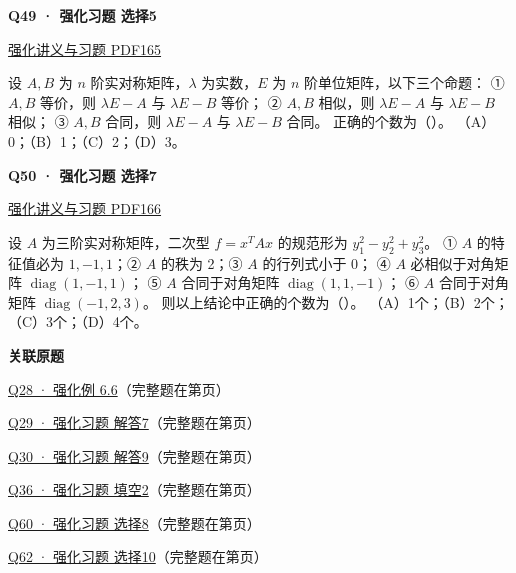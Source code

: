 \documentclass[UTF8,fontset=fandol,11pt,a4paper]{ctexart}
\newcommand{\source}[1]{{\footnotesize\color{Muted}#1\par}}
\newcommand{\qtitle}[2]{\par\needspace{5\baselineskip}\hypertarget{#1}{}\label{#1}\textbf{#2}\par}
\begin{document}
\begin{minipage}{\linewidth}
\qtitle{R-MC-05}{Q49 · 强化习题 选择5}
\source{\href{file:///Users/skyintelligence/Desktop/\%E5\%BE\%97\%E8\%AF\%BB\%E4\%B8\%AA\%E7\%A0\%94-\%E5\%8C\%97\%E5\%A4\%A7\%E8\%BD\%AF\%E5\%BE\%AE/\%E6\%95\%B0\%E5\%AD\%A6\%20150/Kira\%C2\%B727\%E7\%BA\%BF\%E6\%80\%A7\%E4\%BB\%A3\%E6\%95\%B0\%E5\%BC\%BA\%E5\%8C\%96\%E8\%AE\%B2\%E4\%B9\%89\%2B\%E4\%B9\%A0\%E9\%A2\%98.pdf\#page=165}{强化讲义与习题 PDF165}}
设 $A,B$ 为 $n$ 阶实对称矩阵，$\lambda$ 为实数，$E$ 为 $n$ 阶单位矩阵，以下三个命题：
① $A,B$ 等价，则 $\lambda E-A$ 与 $\lambda E-B$ 等价；
② $A,B$ 相似，则 $\lambda E-A$ 与 $\lambda E-B$ 相似；
③ $A,B$ 合同，则 $\lambda E-A$ 与 $\lambda E-B$ 合同。
正确的个数为（\quad）。
（A）0；（B）1；（C）2；（D）3。
\end{minipage}\par\vspace{7mm}
\begin{minipage}{\linewidth}
\qtitle{R-MC-07}{Q50 · 强化习题 选择7}
\source{\href{file:///Users/skyintelligence/Desktop/\%E5\%BE\%97\%E8\%AF\%BB\%E4\%B8\%AA\%E7\%A0\%94-\%E5\%8C\%97\%E5\%A4\%A7\%E8\%BD\%AF\%E5\%BE\%AE/\%E6\%95\%B0\%E5\%AD\%A6\%20150/Kira\%C2\%B727\%E7\%BA\%BF\%E6\%80\%A7\%E4\%BB\%A3\%E6\%95\%B0\%E5\%BC\%BA\%E5\%8C\%96\%E8\%AE\%B2\%E4\%B9\%89\%2B\%E4\%B9\%A0\%E9\%A2\%98.pdf\#page=166}{强化讲义与习题 PDF166}}
设 $A$ 为三阶实对称矩阵，二次型 $f=x^TAx$ 的规范形为 $y_1^2-y_2^2+y_3^2$。
① $A$ 的特征值必为 $1,-1,1$；② $A$ 的秩为 2；③ $A$ 的行列式小于 0；
④ $A$ 必相似于对角矩阵 $\operatorname{diag}(1,-1,1)$；
⑤ $A$ 合同于对角矩阵 $\operatorname{diag}(1,1,-1)$；
⑥ $A$ 合同于对角矩阵 $\operatorname{diag}(-1,2,3)$。
则以上结论中正确的个数为（\quad）。
（A）1个；（B）2个；（C）3个；（D）4个。
\end{minipage}\par\vspace{7mm}
\textbf{关联原题}\par
\hyperlink{R-EX-06}{Q28 · 强化例 6.6}（完整题在第\pageref*{R-EX-06}页）\par
\hyperlink{R-LONG-07}{Q29 · 强化习题 解答7}（完整题在第\pageref*{R-LONG-07}页）\par
\hyperlink{R-LONG-09}{Q30 · 强化习题 解答9}（完整题在第\pageref*{R-LONG-09}页）\par
\hyperlink{R-FILL-02}{Q36 · 强化习题 填空2}（完整题在第\pageref*{R-FILL-02}页）\par
\hyperlink{R-MC-08}{Q60 · 强化习题 选择8}（完整题在第\pageref*{R-MC-08}页）\par
\hyperlink{R-MC-10}{Q62 · 强化习题 选择10}（完整题在第\pageref*{R-MC-10}页）\par
\clearpage
\end{document}
